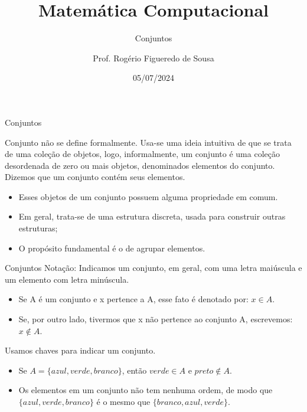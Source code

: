 \documentclass[aspectratio=169]{beamer}
\title{Matemática Computacional}
\subtitle{Conjuntos}
\author{Prof. Rogério Figueredo de Sousa}
\institute{%
\href{rogerio.sousa@ifpi.edu.br}{rogerio.sousa@ifpi.edu.br}%
}%
\date{05/07/2024}
\begin{document}
\begin{frame}[plain]
    \titlepage
\end{frame}




\jsonp
{}

\begin{frame}{Conjuntos}

    Conjunto não se define formalmente. Usa-se uma ideia intuitiva de que se trata de uma coleção de objetos, logo, informalmente, um conjunto é uma coleção desordenada de zero ou mais objetos, denominados elementos do conjunto. Dizemos que um conjunto contém seus elementos.

    \begin{itemize}
        \item Esses objetos de um conjunto possuem alguma propriedade em comum.
        \item Em geral, trata-se de uma estrutura discreta, usada para construir outras estruturas;
        \item O propósito fundamental é o de agrupar elementos.
    \end{itemize}

\end{frame}

\begin{frame}{Conjuntos}
    Notação: Indicamos um conjunto, em geral, com uma letra maiúscula e um elemento com letra minúscula.

    \begin{itemize}
        \item Se A é um conjunto e x pertence a A, esse fato é denotado por: $x \in A$.
        \item Se, por outro lado, tivermos que x não pertence ao conjunto A, escrevemos: $x \notin A$.
    \end{itemize}

    \vspace{2mm}
    Usamos chaves para indicar um conjunto.
    \begin{itemize}
        \item Se $A = \{azul, verde, branco\}$, então $verde \in A$ e $preto \notin A$.
        \item Os elementos em um conjunto não tem nenhuma ordem, de modo que $\{azul, verde, branco\}$ é o mesmo que $\{branco, azul, verde\}$.
    \end{itemize}    

\end{frame}
\end{document}
